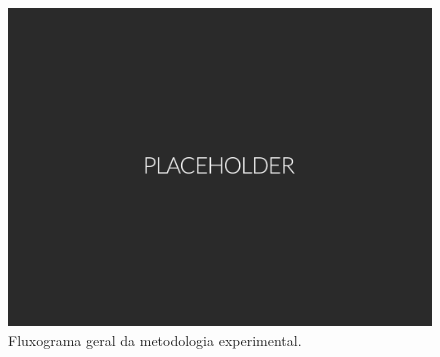 \begin{figure}[!htb]
	\label{fig:rectification}
	\caption{Fluxograma geral da metodologia experimental.}
	\begin{center}
	    \includegraphics[width=0.75\linewidth]{./img/placeholder.png}
	\end{center}
\end{figure}
